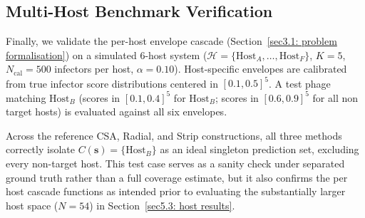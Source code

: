 \subsection{Multi-Host Benchmark Verification}
\label{sec5.1.4: multi host validation}

Finally, we validate the per-host envelope cascade (Section~\ref{sec3.1: problem formalisation}) on a simulated 
6-host system ($\mathcal{H} = \{\text{Host}_A, \dots, \text{Host}_F\}$, $K=5$, $N_{\text{cal}} = 500$ infectors per host, 
$\alpha = 0.10$). Host-specific envelopes are calibrated from true infector score distributions centered in $[0.1, 0.5]^5$. 
A test phage matching $\text{Host}_B$ (scores in $[0.1, 0.4]^5$ for $\text{Host}_B$; scores in $[0.6, 0.9]^5$ for all non 
target hosts) is evaluated against all six envelopes.

Across the reference CSA, Radial, and Strip constructions, all three methods correctly isolate $C(\mathbf{s}) = 
\{\text{Host}_B\}$ as an ideal singleton prediction set, excluding every non-target host. This test case serves as a sanity 
check under separated ground truth rather than a full coverage estimate, but it also confirms the per host cascade 
functions as intended prior to evaluating the substantially larger host space ($N=54$) in Section~\ref{sec5.3: host results}.






